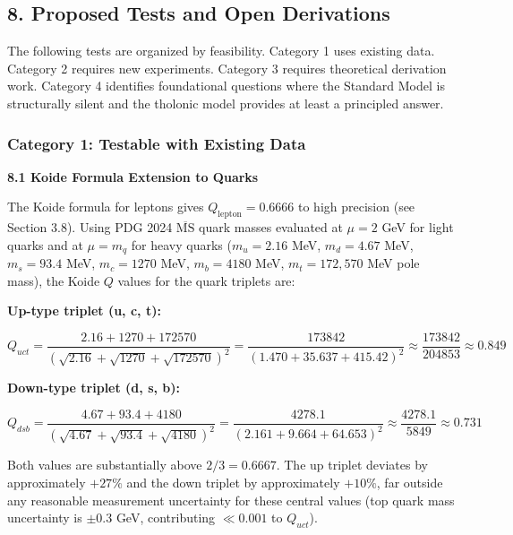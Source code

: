 \documentclass[
  11pt,
  letterpaper,
]{article}
\begin{document}
\subsection{8. Proposed Tests and Open
Derivations}\label{proposed-tests-and-open-derivations}

The following tests are organized by feasibility. Category 1 uses
existing data. Category 2 requires new experiments. Category 3 requires
theoretical derivation work. Category 4 identifies foundational
questions where the Standard Model is structurally silent and the
tholonic model provides at least a principled answer.

\subsubsection{Category 1: Testable with Existing
Data}\label{category-1-testable-with-existing-data}

\textbf{8.1 Koide Formula Extension to Quarks}

The Koide formula for leptons gives \(Q_\text{lepton} = 0.6666\) to high
precision (see Section 3.8). Using PDG 2024 \(\overline{\text{MS}}\)
quark masses evaluated at \(\mu = 2\) GeV for light quarks and at
\(\mu = m_q\) for heavy quarks (\(m_u = 2.16\) MeV, \(m_d = 4.67\) MeV,
\(m_s = 93.4\) MeV, \(m_c = 1270\) MeV, \(m_b = 4180\) MeV,
\(m_t = 172{,}570\) MeV pole mass), the Koide \(Q\) values for the quark
triplets are:

\textbf{Up-type triplet (u, c, t):}

\[Q_{uct} = \frac{2.16 + 1270 + 172570}{(\sqrt{2.16} + \sqrt{1270} + \sqrt{172570})^2} = \frac{173842}{(1.470 + 35.637 + 415.42)^2} \approx \frac{173842}{204853} \approx 0.849\]

\textbf{Down-type triplet (d, s, b):}

\[Q_{dsb} = \frac{4.67 + 93.4 + 4180}{(\sqrt{4.67} + \sqrt{93.4} + \sqrt{4180})^2} = \frac{4278.1}{(2.161 + 9.664 + 64.653)^2} \approx \frac{4278.1}{5849} \approx 0.731\]

Both values are substantially above \(2/3 = 0.6667\). The up triplet
deviates by approximately \(+27\%\) and the down triplet by
approximately \(+10\%\), far outside any reasonable measurement
uncertainty for these central values (top quark mass uncertainty is
\(\pm 0.3\) GeV, contributing \(\ll 0.001\) to \(Q_{uct}\)).
\end{document}
